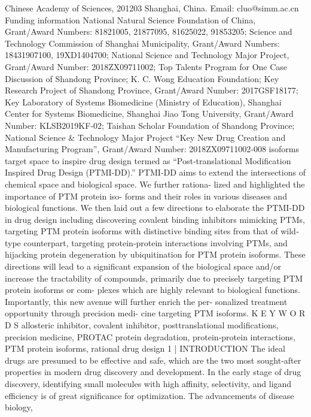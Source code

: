 Chinese Academy of Sciences, 201203
Shanghai, China.
Email: cluo@simm.ac.cn
Funding information
National Natural Science Foundation of
China, Grant/Award Numbers: 81821005,
21877095, 81625022, 91853205; Science
and Technology Commission of Shanghai
Municipality, Grant/Award Numbers:
18431907100, 19XD1404700; National
Science and Technology Major Project,
Grant/Award Number: 2018ZX09711002;
Top Talents Program for One Case
Discussion of Shandong Province; K. C. Wong
Education Foundation; Key Research Project
of Shandong Province, Grant/Award Number:
2017GSF18177; Key Laboratory of Systems
Biomedicine (Ministry of Education),
Shanghai Center for Systems Biomedicine,
Shanghai Jiao Tong University,
Grant/Award Number: KLSB2019KF‐02;
Taishan Scholar Foundation of Shandong
Province; National Science \& Technology
Major Project “Key New Drug Creation
and Manufacturing Program”,
Grant/Award Number: 2018ZX09711002‐008
isoforms target space to inspire drug design termed as
“Post‐translational
Modification
Inspired
Drug
Design
(PTMI‐DD).” PTMI‐DD aims to extend the intersections of
chemical space and biological space. We further rationa-
lized and highlighted the importance of PTM protein iso-
forms and their roles in various diseases and biological
functions. We then laid out a few directions to elaborate
the PTMI‐DD in drug design including discovering covalent
binding inhibitors mimicking PTMs, targeting PTM protein
isoforms with distinctive binding sites from that of wild‐
type counterpart, targeting protein‐protein interactions
involving PTMs, and hijacking protein degeneration by
ubiquitination for PTM protein isoforms. These directions
will lead to a significant expansion of the biological space
and/or increase the tractability of compounds, primarily
due to precisely targeting PTM protein isoforms or com-
plexes which are highly relevant to biological functions.
Importantly, this new avenue will further enrich the per-
sonalized treatment opportunity through precision medi-
cine targeting PTM isoforms.
K E Y W O R D S
allosteric inhibitor, covalent inhibitor, posttranslational
modifications, precision medicine, PROTAC protein degradation,
protein‐protein interactions, PTM protein isoforms, rational drug
design
1
|
INTRODUCTION
The ideal drugs are presumed to be effective and safe, which are the two most sought‐after properties in modern
drug discovery and development. In the early stage of drug discovery, identifying small molecules with high affinity,
selectivity, and ligand efficiency is of great significance for optimization. The advancements of disease biology,
